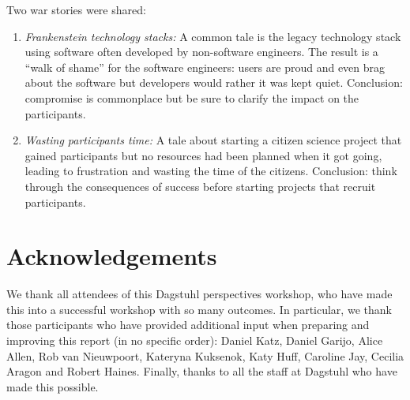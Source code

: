 \documentclass[a4paper,UKenglish]{dagrep}
\begin{document}
Two war stories were shared:
\begin{enumerate}
\item \emph{Frankenstein technology stacks:} A common tale is the legacy technology stack using software often developed by non-software engineers. The result is a ``walk of shame'' for the software engineers: users are proud and even brag about the software but developers would rather it was kept quiet. Conclusion: compromise is commonplace but be sure to clarify the impact on the participants.
\item \emph{Wasting participants time:} A tale about starting a citizen science project that gained participants but no resources had been planned when it got going, leading to frustration and wasting the time of the citizens. Conclusion: think through the consequences of success before starting projects that recruit participants.
\end{enumerate}

\section{Acknowledgements}

We thank all attendees of this Dagstuhl perspectives workshop, who have made this into a successful workshop with so many outcomes. In particular, we thank those participants who have provided additional input when preparing and improving this report (in no specific order): Daniel Katz, Daniel Garijo, Alice Allen, Rob van Nieuwpoort, Kateryna Kuksenok, Katy Huff, Caroline Jay, Cecilia Aragon and Robert Haines. Finally, thanks to all the staff at Dagstuhl who have made this possible.   

%


\end{document}

